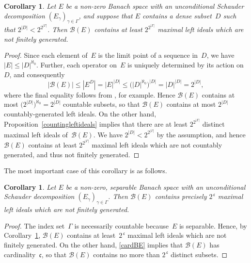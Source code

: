 \documentclass[12pt]{amsart}
\newtheorem{corollary}[theorem]{Corollary}
\theoremstyle{definition}
\numberwithin{equation}{section}
\begin{document}
\begin{corollary}\label{wehaveanideal}
  Let $E$ be a non-zero Banach space with an unconditional Schauder
  decomp\-osition $(E_\gamma)_{\gamma\in \Gamma}$, and suppose that $E$
  contains a dense subset~$D$ such that $2^{|D|} < 2^{2^{|\Gamma|}}$.
  Then $\mathscr{B}(E)$ contains at least $2^{2^{|\Gamma|}}$ maximal
  left ideals which are not finitely generated.
\end{corollary}

\begin{proof} 
  Since each element of~$E$ is the limit point of a sequence in~$D$,
  we have $|E|{\ensuremath{\leqslant}}|D|^{\aleph_0}$. Further, each operator on~$E$ is
  uniquely determined by its action on~$D$, and consequently
  \begin{equation}\label{cardBE} |\mathscr{B}(E)|{\ensuremath{\leqslant}} |E^D| =
    |E|^{|D|}{\ensuremath{\leqslant}}  \bigl(|D|^{\aleph_0}\bigr)^{|D|} = |D|^{|D|} =
    2^{|D|}, 
  \end{equation} 
  where the final equality follows from \cite[Lemma~5.6]{jech}, for
  example.  Hence $\mathscr{B}(E)$ contains at most
  $\bigl(2^{|D|}\bigr)^{\aleph_0} = 2^{|D|}$ countable subsets, so
  that $\mathscr{B}(E)$ contains at most $2^{|D|}$ countably-generated
  left ideals. On the other hand, Proposition~\ref{countingleftideals}
  implies that there are at least $2^{2^{|\Gamma|}}$ distinct maximal
  left ideals of~$\mathscr{B}(E)$.  We have $2^{|D|}<2^{2^{|\Gamma|}}$
  by the assumption, and hence $\mathscr{B}(E)$ contains at least
  $2^{2^{|\Gamma|}}$ maximal left ideals which are not countably
  generated, and thus not finitely generated.
\end{proof}

The most important case of this corollary is as follows.
\begin{corollary}\label{countablescauderdecomp}
  Let $E$ be a non-zero, separable Banach space with an unconditional Schau\-der
  de\-com\-po\-si\-tion $(E_\gamma)_{\gamma\in\Gamma}$.  Then
  $\mathscr{B}(E)$ contains precisely $2^{\,\mathfrak{c}}$ maximal
  left ideals which are not finitely generated. \end{corollary}

\begin{proof}
The index set~$\Gamma$ is necessarily countable because~$E$ is
separable. Hence, by Corollary~\ref{wehaveanideal}, $\mathscr{B}(E)$
contains at least~$2^{\,\mathfrak{c}}$ maximal left ideals which are
not finitely generated. On the other hand, \eqref{cardBE} implies that
$\mathscr{B}(E)$ has cardinality~$\mathfrak{c}$, so that
$\mathscr{B}(E)$ contains no more than $2^{\,\mathfrak{c}}$ distinct
subsets.
\end{proof}
\end{document}
